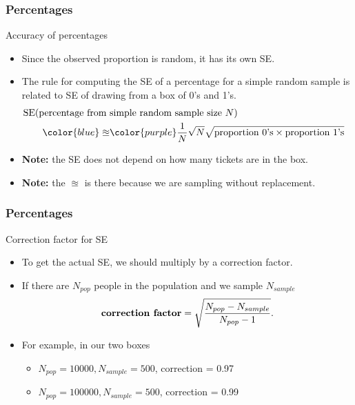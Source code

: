 \documentclass[handout]{beamer}
\begin{document}

   \begin{frame} \frametitle{Percentages}

   \begin{block}
   {Accuracy of percentages}
   \begin{itemize}
   \item Since the observed proportion is random, it has its own SE.
   \item The rule for computing the SE of a percentage
   for a simple random sample is related to SE of drawing
   from a box of 0's and 1's.
   $$
   \begin{aligned}
   \lefteqn{\text{SE(percentage from simple random sample size $N$)}} \\
   & \qquad {\color{blue} \approxeq} {\color{purple} \frac{1}{N} } \sqrt{N} \sqrt{\text{proportion 0's} \times \text{proportion 1's}}
   \end{aligned}
   $$

   \item {\bf Note:} the SE does not depend on how many tickets are in the box.
   \item {\bf Note:} the {\color{blue} $\approxeq$} is there because
   we are sampling without replacement.
   \end{itemize}
   \end{block}
   \end{frame}


   \begin{frame} \frametitle{Percentages}

   \begin{block}
   {Correction factor for SE}
   \begin{itemize}
   \item To get the actual SE, we should multiply by a correction factor.
   \item If there are $N_{pop}$ people in the population
   and we sample $N_{sample}$
   $$
   \text{{\bf correction factor}} = \sqrt{\frac{N_{pop}-N_{sample}}{N_{pop}-1}}.
   $$
   \item For example, in our two boxes
   \begin{itemize}
   \item $N_{pop}=10000, N_{sample}=500$, correction = 0.97
   \item $N_{pop}=100000, N_{sample}=500$, correction = 0.99
   \end{itemize}
   \end{itemize}
   \end{block}
   \end{frame}
\end{document}
